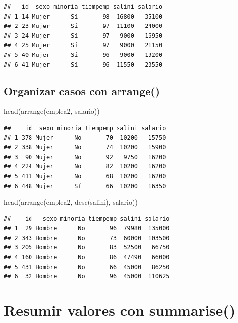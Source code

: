 \documentclass[
]{book}
\newenvironment{Shaded}{\begin{snugshade}}{\end{snugshade}}
\newcommand{\FunctionTok}[1]{\textcolor[rgb]{0.00,0.00,0.00}{#1}}
\newcommand{\NormalTok}[1]{#1}
\theoremstyle{break}
\theoremstyle{nonumberplain}
\begin{document}
\begin{verbatim}
##   id  sexo minoria tiempemp salini salario
## 1 14 Mujer      Sí       98  16800   35100
## 2 23 Mujer      Sí       97  11100   24000
## 3 24 Mujer      Sí       97   9000   16950
## 4 25 Mujer      Sí       97   9000   21150
## 5 40 Mujer      Sí       96   9000   19200
## 6 41 Mujer      Sí       96  11550   23550
\end{verbatim}

\hypertarget{organizar-casos-con-arrange}{%
\subsection{\texorpdfstring{Organizar casos con \textbf{arrange()}}{Organizar casos con arrange()}}\label{organizar-casos-con-arrange}}

\begin{Shaded}
\begin{Highlighting}[]
\FunctionTok{head}\NormalTok{(}\FunctionTok{arrange}\NormalTok{(emplea2, salario))}
\end{Highlighting}
\end{Shaded}

\begin{verbatim}
##    id  sexo minoria tiempemp salini salario
## 1 378 Mujer      No       70  10200   15750
## 2 338 Mujer      No       74  10200   15900
## 3  90 Mujer      No       92   9750   16200
## 4 224 Mujer      No       82  10200   16200
## 5 411 Mujer      No       68  10200   16200
## 6 448 Mujer      Sí       66  10200   16350
\end{verbatim}

\begin{Shaded}
\begin{Highlighting}[]
\FunctionTok{head}\NormalTok{(}\FunctionTok{arrange}\NormalTok{(emplea2, }\FunctionTok{desc}\NormalTok{(salini), salario))}
\end{Highlighting}
\end{Shaded}

\begin{verbatim}
##    id   sexo minoria tiempemp salini salario
## 1  29 Hombre      No       96  79980  135000
## 2 343 Hombre      No       73  60000  103500
## 3 205 Hombre      No       83  52500   66750
## 4 160 Hombre      No       86  47490   66000
## 5 431 Hombre      No       66  45000   86250
## 6  32 Hombre      No       96  45000  110625
\end{verbatim}

\hypertarget{resumir-valores-con-summarise}{%
\section{\texorpdfstring{Resumir valores con \textbf{summarise()}}{Resumir valores con summarise()}}\label{resumir-valores-con-summarise}}
\end{document}
